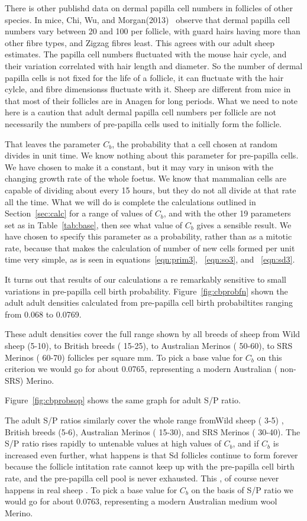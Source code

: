 \documentclass[titlepage]{article}  %
\begin{document}
There is other publishd data on dermal papilla cell numbers in follicles of other species. In mice, Chi, Wu, and Morgan(2013)~\cite{chi:13} observe that dermal papilla cell numbers vary between 20 and 100 per follicle, with guard hairs having more than other fibre types, and Zigzag fibres least. This agrees with our adult sheep estimates. The papilla cell numbers fluctuated with the mouse hair cycle, and their variation correlated with hair length and diameter. So the number of dermal papilla cells is not fixed for the life of a follicle, it can fluctuate with the hair cylcle, and fibre dimensionss fluctuate with it. Sheep are different from mice in that most of their follicles are in Anagen for long periods.  What we need to note here is a caution that adult dermal papilla cell numbers per follicle are not necessarily the numbers of pre-papilla cells used to initially form the follicle.

That leaves the parameter $C_{b}$, the probability that a cell chosen at random divides in unit time. We know nothing about this parameter for pre-papilla cells. We have chosen to make it a constant, but it may vary in unison with the changing growth rate of the whole foetus. We know that mammalian cells are capable of dividing about every 15 hours, but they do not all divide at that rate all the time. What we will do is complete the calculations outlined in Section~\ref{sec:calc} for a range of values of $C_{b}$, and with the other 19 parameters set as in Table~\ref{tab:base}, then see what value of $C_{b}$ gives a sensible result. We have chosen to specify this parameter as a probability, rather than as a mitotic rate, because that makes the calculation of number of new cells formed per unit time very simple, as is seen in equations~\ref{eqn:prim3}, ~\ref{eqn:so3}, and ~\ref{eqn:sd3}.

It turns out that results of our calculations a re remarkably sensitive to small variations in pre-papilla cell birth probability. Figure~\ref{fig:cbprobfn} shown the adult adult densities calculated from pre-papilla cell birth probabiltites ranging from 0.068 to 0.0769. 

These adult densities cover the full range shown by all breeds of sheep from Wild sheep (5-10), to British breeds ( 15-25), to Australian Merinos ( 50-60), to SRS Merinos ( 60-70) follicles per square mm. To pick a base value for $C_{b}$ on this criterion we would go for about 0.0765, representing a modern Australian ( non-SRS) Merino. 

Figure~\ref{fig:cbprobsop} shows the same graph for adult S/P ratio. 

The adult S/P ratios similarly cover the whole range fromWild sheep ( 3-5) , British breeds (5-6), Australian Merinos ( 15-30), and SRS Merinos ( 30-40). The S/P ratio rises rapidly to untenable values at high values of $C_{b}$, and if  $C_{b}$ is increased even further, what happens is that Sd follicles continue to form forever because the follicle intitation rate cannot keep up with the pre-papilla cell birth rate, and the pre-papilla cell pool is never exhausted. This , of course never happens in real sheep . To pick a base value for $C_{b}$ on the basis of S/P ratio we would go for about 0.0763, representing a modern Australian medium wool Merino. 
\end{document}
